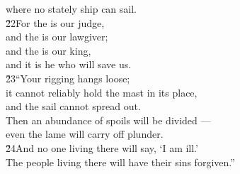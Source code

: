 \begin{poetry}
\poemll    where no stately ship can sail. \\
\poeml \v{22}For the  is our judge, \\
\poemll    and the  is our lawgiver; \\
\poeml and the  is our king, \\
\poemll    and it is he who will save us. \\
\poeml \v{23}``Your rigging hangs loose; \\
\poemll    it cannot reliably hold the mast in its place, \\
\poemlll       and the sail cannot spread out. \\
\poeml Then an abundance of spoils will be divided --- \\
\poemll    even the lame will carry off plunder. \\
\poeml \v{24}And no one living there will say, `I am ill.' \\
\poemll    The people living there will have their sins forgiven.''
\end{poetry}

